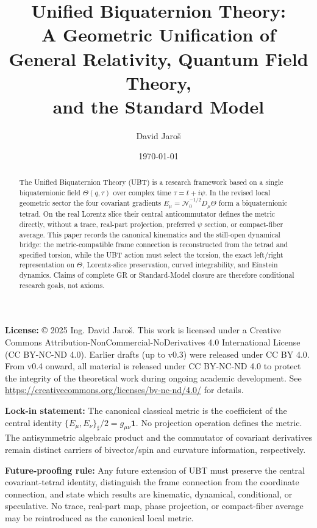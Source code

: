 \documentclass[12pt,a4paper]{article}
\title{Unified Biquaternion Theory:\\
A Geometric Unification of General Relativity, Quantum Field Theory,\\
and the Standard Model}
\author{David Jaroš}
\date{\today}
\begin{document}
\maketitle
\UBTProvenanceNotice

\noindent
\textbf{License:} © 2025 Ing. David Jaroš. This work is licensed under a Creative Commons Attribution-NonCommercial-NoDerivatives 4.0 International License (CC BY-NC-ND 4.0). Earlier drafts (up to v0.3) were released under CC BY 4.0. From v0.4 onward, all material is released under CC BY-NC-ND 4.0 to protect the integrity of the theoretical work during ongoing academic development. See \url{https://creativecommons.org/licenses/by-nc-nd/4.0/} for details.

\vspace{1em}

\begin{abstract}
The Unified Biquaternion Theory (UBT) is a research framework based on a single biquaternionic field $\Theta(q,\tau)$ over complex time $\tau=t+i\psi$.  In the revised local geometric sector the four covariant gradients $E_\mu=\mathcal N_0^{-1/2}D_\mu\Theta$ form a biquaternionic tetrad.  On the real Lorentz slice their central anticommutator defines the metric directly, without a trace, real-part projection, preferred $\psi$ section, or compact-fiber average.  This paper records the canonical kinematics and the still-open dynamical bridge: the metric-compatible frame connection is reconstructed from the tetrad and specified torsion, while the UBT action must select the torsion, the exact left/right representation on $\Theta$, Lorentz-slice preservation, curved integrability, and Einstein dynamics.  Claims of complete GR or Standard-Model closure are therefore conditional research goals, not axioms.
\end{abstract}

\noindent\textbf{Lock-in statement:} The canonical classical metric is the coefficient of the central identity $\{E_\mu,E_\nu\}_\sharp/2=g_{\mu\nu}\mathbf1$.  No projection operation defines the metric.  The antisymmetric algebraic product and the commutator of covariant derivatives remain distinct carriers of bivector/spin and curvature information, respectively.

\vspace{0.5em}

\noindent\textbf{Future-proofing rule:} Any future extension of UBT must preserve the central covariant-tetrad identity, distinguish the frame connection from the coordinate connection, and state which results are kinematic, dynamical, conditional, or speculative.  No trace, real-part map, phase projection, or compact-fiber average may be reintroduced as the canonical local metric.
\end{document}
